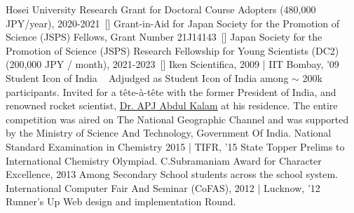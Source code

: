 \begin{talks}
    \award
    {Hosei University Research Grant for Doctoral Course Adopters (480,000 JPY/year), 2020-2021}{}{\normalfont ~[\href{https://www.hosei.ac.jp/gs/gakuhi/gakuhi-shogakukin/shogakukin/kenkyujoseikin/}{\small{\websiteSymbol}}]}{}
    \award
    {Grant-in-Aid for Japan Society for the Promotion of Science (JSPS) Fellows, Grant Number 21J14143}{}{\normalfont ~[\href{https://kaken.nii.ac.jp/en/grant/KAKENHI-PROJECT-21J14143/}{\small{\websiteSymbol}}]}{}
    \award
    {Japan Society for the Promotion of Science (JSPS) Research Fellowship for Young Scientists (DC2) (200,000 JPY / month), 2021-2023}{}{\normalfont ~[\href{https://www.jsps.go.jp/english/e-pd/index.html}{\small{\websiteSymbol}}]}{}
    \award
	{Iken Scientifica, 2009 | }{IIT Bombay, '09}
	{Student Icon of India ~ {}}
	{Adjudged as Student Icon of India among $\sim$ 200k participants. Invited for a tête-à-tête with the former President of India, and renowned rocket scientist, \href{https://en.wikipedia.org/wiki/A._P._J._Abdul_Kalam}{Dr. APJ Abdul Kalam} at his residence. The entire competition  was aired on The National Geographic Channel and was supported by the Ministry of Science And Technology, Government Of India.}
	\award
	{National Standard Examination in Chemistry 2015 | }{TIFR, '15}
	{State Topper}
	{Prelims to International Chemistry Olympiad.}
	\award
	{C.Subramaniam Award for Character Excellence, 2013}{}
	{}
	{Among Secondary School students across the school system.}
	\award
	{International Computer Fair And Seminar (CoFAS), 2012 | }{Lucknow, '12}
	{Runner's Up}
	{Web design and implementation Round.}
	
\end{talks}    
\vspace{-3mm}

